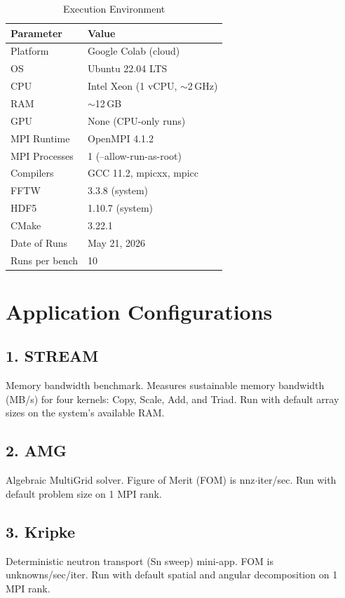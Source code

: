\documentclass[12pt,a4paper]{article}
\begin{document}
\begin{table}[H]
\centering
\caption{Execution Environment}
\begin{tabular}{ll}
\toprule
\textbf{Parameter} & \textbf{Value} \\
\midrule
Platform        & Google Colab (cloud) \\
OS              & Ubuntu 22.04 LTS \\
CPU             & Intel Xeon (1 vCPU, $\sim$2\,GHz) \\
RAM             & $\sim$12\,GB \\
GPU             & None (CPU-only runs) \\
MPI Runtime     & OpenMPI 4.1.2 \\
MPI Processes   & 1 (--allow-run-as-root) \\
Compilers       & GCC 11.2, mpicxx, mpicc \\
FFTW            & 3.3.8 (system) \\
HDF5            & 1.10.7 (system) \\
CMake           & 3.22.1 \\
Date of Runs    & May 21, 2026 \\
Runs per bench  & 10 \\
\bottomrule
\end{tabular}
\end{table}

\section{Application Configurations}

\subsection{1. STREAM}
Memory bandwidth benchmark. Measures sustainable memory bandwidth (MB/s) for four kernels: Copy, Scale, Add, and Triad. Run with default array sizes on the system's available RAM.

\subsection{2. AMG}
Algebraic MultiGrid solver. Figure of Merit (FOM) is nnz$\cdot$iter/sec. Run with default problem size on 1 MPI rank.

\subsection{3. Kripke}
Deterministic neutron transport (Sn sweep) mini-app. FOM is unknowns/sec/iter. Run with default spatial and angular decomposition on 1 MPI rank.
\end{document}
